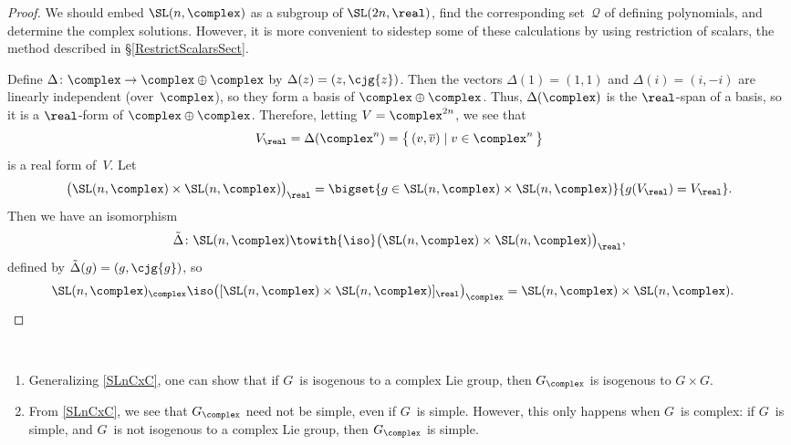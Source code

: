 \begin{proof}
 We should embed $\SL(n,\complex)$ as a subgroup of
$\SL(2n,\real)$, find the corresponding set~$\mathcal{Q}$ of
defining polynomials, and determine the complex solutions.
However, it is more convenient to sidestep some of these
calculations by using restriction of scalars, the method
described in \S\ref{RestrictScalarsSect}.

Define $\Delta \colon \complex \to \complex \oplus \complex$
by $\Delta(z) = (z, \cjg{z})$. Then the vectors $\Delta(1) =
(1,1)$ and $\Delta(i) = (i,-i)$ are linearly independent
(over~$\complex$), so they form a basis of $\complex \oplus
\complex$. Thus, $\Delta(\complex)$ is the $\real$-span
of a basis, so it is a $\real$-form of $\complex \oplus
\complex$. Therefore, letting $V = \complex^{2n}$, we see
that
 $$ V_{\real} = \Delta(\complex^n)
 = \bigl\{\, ( v, \overline{v} )
 \mid v \in \complex^n \, \bigr\} $$
 is a real form of~$V$. Let
 $$ \bigl( \SL(n,\complex) \times 
\SL(n,\complex) \bigr)_{\real}
 = \bigset{
 g \in \SL(n,\complex) \times \SL(n,\complex)
 }{
 g (V_{\real}) = V_{\real}
 } .$$
 Then we have an isomorphism 
 $$\tilde \Delta \colon
\SL(n,\complex) \towith{\iso} \bigl(
\SL(n,\complex) \times \SL(n,\complex) \bigr)_{\real} ,$$
 defined by $\tilde
\Delta(g) = (g,\cjg{g})$, so
 \begin{align*}
  \SL(n,\complex)_{\complex}
 \iso \bigl( [\SL(n,\complex) \times \SL(n,\complex)]_{\real}
\bigr)_{\complex}
 = \SL(n,\complex) \times \SL(n,\complex) 
 . & \qedhere \end{align*}
 \end{proof}

\begin{rems} \ \label{GxC=GxGiff}
 \noprelistbreak
 \begin{enumerate}
 \item Generalizing \cref{SLnCxC}, one can show that if
$G$~is isogenous to a complex Lie group, then $G_\complex$ is isogenous to $G \times G$. 
 \item From \cref{SLnCxC}, we see that $G_\complex$ need not be simple, even if $G$~is simple.
However, this only happens when $G$~is complex: if $G$~is
simple, and $G$~is not isogenous to a complex Lie group,
then $G_{\complex}$ is simple.
 \end{enumerate}
 \end{rems}

